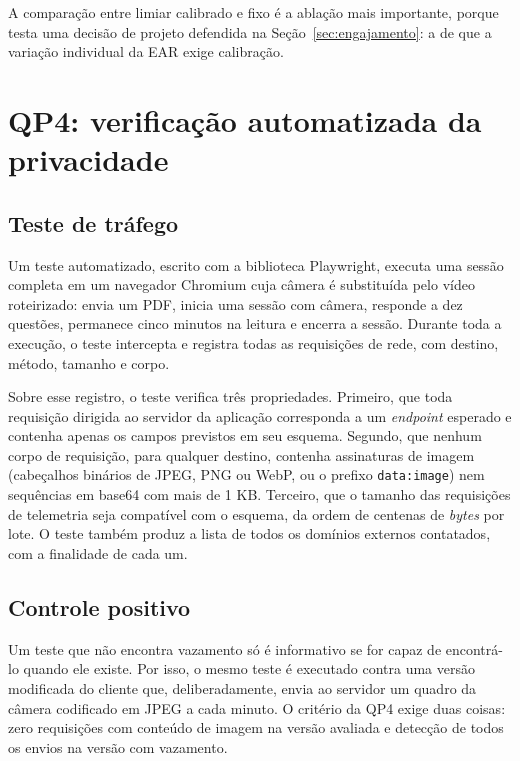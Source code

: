 \documentclass[portuguese,oneside]{tcc}
\newcommand{\estr}[1]{\emph{#1}}
\begin{document}
A comparação entre limiar calibrado e fixo é a ablação mais importante, porque testa uma decisão de projeto defendida na Seção~\ref{sec:engajamento}: a de que a variação individual da EAR exige calibração.

\section{\label{sec:met-qp4}QP4: verificação automatizada da privacidade}

\subsection{Teste de tráfego}

Um teste automatizado, escrito com a biblioteca Playwright, executa uma sessão completa em um navegador Chromium cuja câmera é substituída pelo vídeo roteirizado: envia um PDF, inicia uma sessão com câmera, responde a dez questões, permanece cinco minutos na leitura e encerra a sessão. Durante toda a execução, o teste intercepta e registra todas as requisições de rede, com destino, método, tamanho e corpo.

Sobre esse registro, o teste verifica três propriedades. Primeiro, que toda requisição dirigida ao servidor da aplicação corresponda a um \estr{endpoint} esperado e contenha apenas os campos previstos em seu esquema. Segundo, que nenhum corpo de requisição, para qualquer destino, contenha assinaturas de imagem (cabeçalhos binários de JPEG, PNG ou WebP, ou o prefixo \texttt{data:image}) nem sequências em base64 com mais de 1 KB. Terceiro, que o tamanho das requisições de telemetria seja compatível com o esquema, da ordem de centenas de \estr{bytes} por lote. O teste também produz a lista de todos os domínios externos contatados, com a finalidade de cada um.

\subsection{Controle positivo}

Um teste que não encontra vazamento só é informativo se for capaz de encontrá-lo quando ele existe. Por isso, o mesmo teste é executado contra uma versão modificada do cliente que, deliberadamente, envia ao servidor um quadro da câmera codificado em JPEG a cada minuto. O critério da QP4 exige duas coisas: zero requisições com conteúdo de imagem na versão avaliada e detecção de todos os envios na versão com vazamento.
\end{document}
